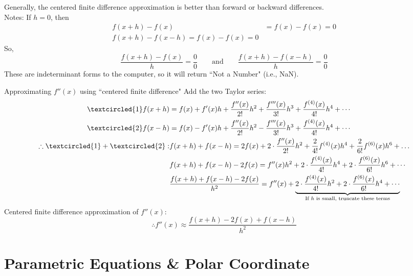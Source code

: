 \documentclass[12pt,a4paper]{article}
\begin{document}
Generally, the centered finite difference approximation is better than forward or backward differences. \\
Notes: If $h=0$, then \[\begin{aligned} f(x+h)-f(x)&=f(x)-f(x)=0\\f(x+h)-f(x-h)=f(x)-f(x)=0\end{aligned}\]
So, \[\frac{f(x+h)-f(x)}{h}=\frac{0}{0}\qquad\text{and}\qquad\frac{f(x+h)-f(x-h)}{h}=\frac{0}{0}\]
These are indeterminant forms to the computer, so it will return ``Not a Number" (i.e., NaN). 
\begin{thm}{Approximating $f''(x)$ using ``centered finite difference"}
	Add the two Taylor series: 	
	\[\begin{aligned}
		\textcircled{1} f(x+h)&=f(x)+f'(x)h+\frac{f''(x)}{2!}h^2+\frac{f'''(x)}{3!}h^3+\frac{f^{(4)}(x)}{4!}h^4+\cdots\\
		\textcircled{2} f(x-h)&=f(x)-f'(x)h+\frac{f''(x)}{2!}h^2-\frac{f'''(x)}{3!}h^3+\frac{f^{(4)}(x)}{4!}h^4+\cdots\\
		\therefore \textcircled{1}+\textcircled{2}: & f(x+h)+f(x-h)=2f(x)+2\cdot\frac{f''(x)}{2!}h^2+\frac{2}{4!}f^{(4)}(x)h^4+\frac{2}{6!}f^{(6)}(x)h^6+\dots\\
		& f(x+h)+f(x-h)-2f(x)=f''(x)h^2+2\cdot\frac{f^{(4)}(x)}{4!}h^4+2\cdot\frac{f^{(6)}(x)}{6!}h^6+\cdots\\
		&\frac{f(x+h)+f(x-h)-2f(x)}{h^2}=f''(x)+\underbrace{2\cdot\frac{f^{(4)}(x)}{4!}h^2+2\cdot\frac{f^{(6)}(x)}{6!}h^4+\cdots}_{\text{If }h\text{ is small, truncate these terms}}
	\end{aligned}\]
	Centered finite difference approximation of $f''(x)$: 
	\[\boxed{\therefore f''(x)\approx\frac{f(x+h)-2f(x)+f(x-h)}{h^2}}\]
\end{thm}

\newpage
\section{Parametric Equations \& Polar Coordinate}
\end{document}
